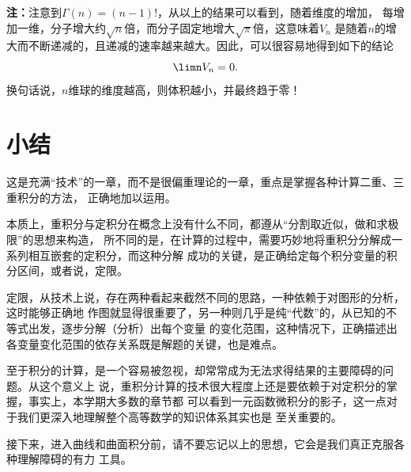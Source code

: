 {\bf 注：}注意到$\Gamma(n)=(n-1)!$，从以上的结果可以看到，随着维度的增加，
每增加一维，分子增大约$\sqrt{n}$倍，而分子固定地增大$\sqrt{\pi}$倍，这意味着$V_n$
是随着$n$的增大而不断递减的，且递减的速率越来越大。因此，可以很容易地得到如下的结论
$$\limn V_n=0.$$
换句话说，$n$维球的维度越高，则体积越小，并最终趋于零！

\section{小结}

这是充满“技术”的一章，而不是很偏重理论的一章，重点是掌握各种计算二重、三重积分的方法，
正确地加以运用。

本质上，重积分与定积分在概念上没有什么不同，都遵从“分割取近似，做和求极限”的思想来构造，
所不同的是，在计算的过程中，需要巧妙地将重积分分解成一系列相互嵌套的定积分，而这种分解
成功的关键，是正确给定每个积分变量的积分区间，或者说，定限。

定限，从技术上说，存在两种看起来截然不同的思路，一种依赖于对图形的分析，这时能够正确地
作图就显得很重要了，另一种则几乎是纯“代数”的，从已知的不等式出发，逐步分解（分析）出每个变量
的变化范围，这种情况下，正确描述出各变量变化范围的依存关系既是解题的关键，也是难点。

至于积分的计算，是一个容易被忽视，却常常成为无法求得结果的主要障碍的问题。从这个意义上
说，重积分计算的技术很大程度上还是要依赖于对定积分的掌握，事实上，本学期大多数的章节都
可以看到一元函数微积分的影子，这一点对于我们更深入地理解整个高等数学的知识体系其实也是
至关重要的。

接下来，进入曲线和曲面积分前，请不要忘记以上的思想，它会是我们真正克服各种理解障碍的有力
工具。

